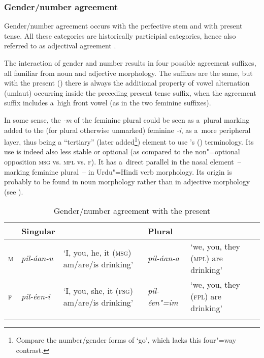 \subsubsection*{Gender/number agreement}

Gender/number agreement occurs with the perfective stem and with present tense. All these categories
are historically participial categories, hence also referred to as adjectival agreement
\citep[260]{masica1991}.



The interaction of gender and number results in four possible agreement suffixes, all familiar from noun and adjective morphology. The suffixes are the same, but with the present () there is always the additional property of vowel alternation (umlaut) occurring inside the preceding present tense suffix, when the agreement suffix includes a~high front vowel (as in the two feminine suffixes).



In some sense, the \textit{-m} of the feminine plural could be seen as a~plural marking added to the (for plural otherwise unmarked) feminine \textit{-i}, as a~more peripheral layer, thus being a ``tertiary'' (later added\footnote{Compare the number/gender forms of `go', which lacks this four"=way contrast.}) element to use \citeauthor{masica1991}'s (\citeyear[260--261]{masica1991}) terminology. Its use is indeed also less stable or optional (as compared to the non"=optional opposition \textsc{msg} vs. \textsc{mpl} vs. \textsc{f}). It has a~direct parallel in the nasal element~-- marking feminine plural~-- in Urdu"=Hindi verb morphology. Its origin is probably to be found in noun morphology rather than in adjective morphology (see ).


\begin{table}[ht]
\caption{Gender/number agreement with the present}
\begin{tabularx}{\textwidth}{ l l Q l Q }
\lsptoprule
&
Singular &
&
Plural &
\\\hline
\textsc{m} &
\textit{pil-áan-u} &
`I, you, he, it (\textsc{msg}) am/are/is drinking' &
\textit{pil-áan-a} &
`we, you, they (\textsc{mpl}) are drinking'\\
\textsc{f} &
\textit{pil-éen-i} &
`I, you, she, it (\textsc{fsg}) am/are/is drinking' &
\textit{pil-éen"=im} &
`we, you, they (\textsc{fpl}) are drinking'\\\lspbottomrule
\end{tabularx}
\label{tab:8-18}
\end{table}


